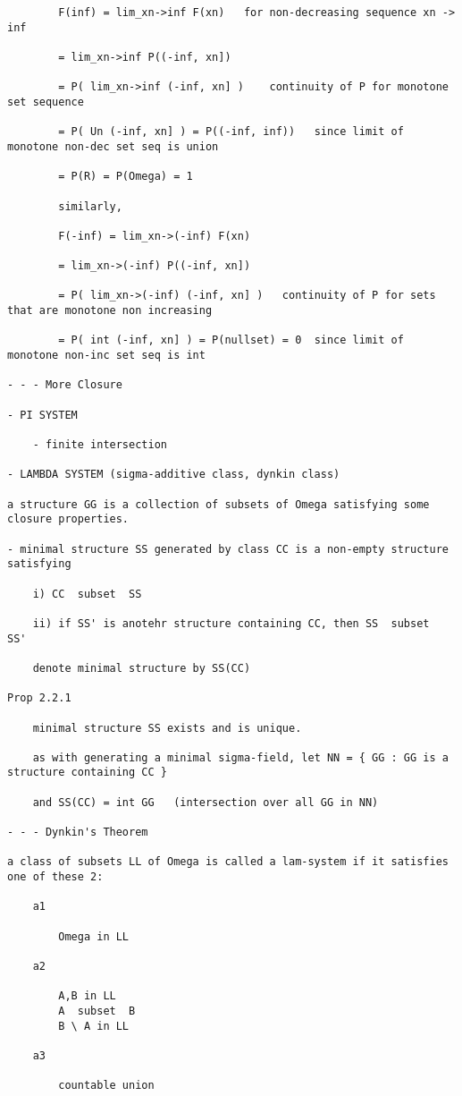 \documentclass{article}
\begin{document}
\begin{flushleft}
\begin{verbatim}
		F(inf) = lim_xn->inf F(xn)   for non-decreasing sequence xn -> inf
		
		= lim_xn->inf P((-inf, xn])
		
		= P( lim_xn->inf (-inf, xn] )    continuity of P for monotone set sequence
		
		= P( Un (-inf, xn] ) = P((-inf, inf))   since limit of monotone non-dec set seq is union
		
		= P(R) = P(Omega) = 1
		
		similarly, 
		
		F(-inf) = lim_xn->(-inf) F(xn) 
		
		= lim_xn->(-inf) P((-inf, xn])
		
		= P( lim_xn->(-inf) (-inf, xn] )   continuity of P for sets that are monotone non increasing
		
		= P( int (-inf, xn] ) = P(nullset) = 0  since limit of monotone non-inc set seq is int
		
- - - More Closure

- PI SYSTEM

	- finite intersection
	
- LAMBDA SYSTEM (sigma-additive class, dynkin class)

a structure GG is a collection of subsets of Omega satisfying some closure properties.

- minimal structure SS generated by class CC is a non-empty structure satisfying

	i) CC  subset  SS
	
	ii) if SS' is anotehr structure containing CC, then SS  subset  SS'
	
	denote minimal structure by SS(CC)
	
Prop 2.2.1

	minimal structure SS exists and is unique.
	
	as with generating a minimal sigma-field, let NN = { GG : GG is a structure containing CC }
	
	and SS(CC) = int GG   (intersection over all GG in NN)
	
- - - Dynkin's Theorem

a class of subsets LL of Omega is called a lam-system if it satisfies one of these 2:

	a1
	
		Omega in LL
	
	a2
	
		A,B in LL
		A  subset  B
		B \ A in LL
	
	a3
	
		countable union
	

\end{verbatim}
\end{flushleft}
\end{document}
